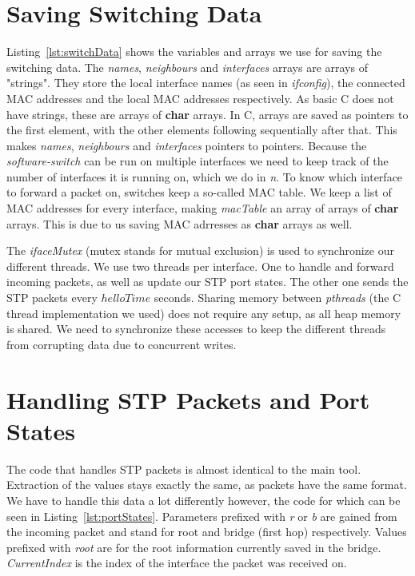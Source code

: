 \section{Saving Switching Data}

Listing~\ref{lst:switchData} shows the variables and arrays we use for saving the switching data.
The \textit{names}, \textit{neighbours} and \textit{interfaces} arrays are arrays of "strings".
They store the local interface names (as seen in \textit{ifconfig}), the connected MAC addresses and the local MAC addresses respectively.
As basic C does not have strings, these are arrays of \textbf{char} arrays.
In C, arrays are saved as pointers to the first element, with the other elements following sequentially after that.
This makes \textit{names}, \textit{neighbours} and \textit{interfaces} pointers to pointers.
Because the \textit{software-switch} can be run on multiple interfaces we need to keep track of the number of interfaces it is running on, which we do in \textit{n}.
To know which interface to forward a packet on, switches keep a so-called MAC table.
We keep a list of MAC addresses for every interface, making \textit{macTable} an array of arrays of \textbf{char} arrays.
This is due to us saving MAC adrresses as \textbf{char} arrays as well.

The \textit{ifaceMutex} (mutex stands for mutual exclusion) is used to synchronize our different threads.
We use two threads per interface.
One to handle and forward incoming packets, as well as update our STP port states.
The other one sends the STP packets every $helloTime$ seconds.
Sharing memory between \textit{pthreads} (the C thread implementation we used) does not require any setup, as all heap memory is shared\cite{pthreads}.
We need to synchronize these accesses to keep the different threads from corrupting data due to concurrent writes.

\section{Handling STP Packets and Port States}
The code that handles STP packets is almost identical to the main tool.
Extraction of the values stays exactly the same, as packets have the same format.
We have to handle this data a lot differently however, the code for which can be seen in Listing~\ref{lst:portStates}.
Parameters prefixed with \textit{r} or \textit{b} are gained from the incoming packet and stand for root and bridge (first hop) respectively.
Values prefixed with \textit{root} are for the root information currently saved in the bridge.
\textit{CurrentIndex} is the index of the interface the packet was received on.


